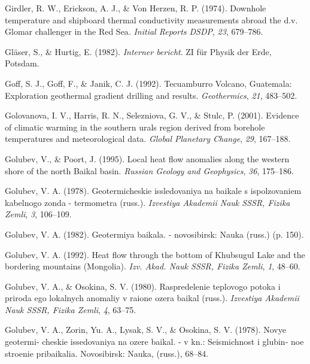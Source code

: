 \documentclass[draft,linenumbers]{agujournal2018}
\begin{document}
\leavevmode{}%
Girdler, R. W., Erickson, A. J., \& Von Herzen, R. P. (1974). Downhole
temperature and shipboard thermal conductivity measurements abroad the
d.v. Glomar challenger in the {Red Sea}. \emph{Initial Reports DSDP},
\emph{23}, 679--786.

\leavevmode{}%
Gläser, S., \& Hurtig, E. (1982). \emph{Interner bericht}. ZI f{ü}r
Physik der Erde, Potsdam.

\leavevmode{}%
Goff, S. J., Goff, F., \& Janik, C. J. (1992). {Tecuamburro Volcano,
Guatemala}: Exploration geothermal gradient drilling and results.
\emph{Geothermics}, \emph{21}, 483--502.

\leavevmode{}%
Golovanova, I. V., Harris, R. N., Selezniova, G. V., \& Stulc, P.
(2001). Evidence of climatic warming in the southern urals region
derived from borehole temperatures and meteorological data. \emph{Global
Planetary Change}, \emph{29}, 167--188.

\leavevmode{}%
Golubev, V., \& Poort, J. (1995). Local heat flow anomalies along the
western shore of the north {Baikal} basin. \emph{Russian Geology and
Geophysics}, \emph{36}, 175--186.

\leavevmode{}%
Golubev, V. A. (1978). Geotermicheskie issledovaniya na baikale s
ispolzovaniem kabelnogo zonda - termometra (russ.). \emph{Izvestiya
Akademii Nauk SSSR, Fizika Zemli}, \emph{3}, 106--109.

\leavevmode{}%
Golubev, V. A. (1982). Geotermiya baikala. - novosibirsk: Nauka (russ.)
(p. 150).

\leavevmode{}%
Golubev, V. A. (1992). Heat flow through the bottom of {Khubsugul Lake}
and the bordering mountains {(Mongolia)}. \emph{Izv. Akad. Nauk SSSR,
Fizika Zemli}, \emph{1}, 48--60.

\leavevmode{}%
Golubev, V. A., \& Osokina, S. V. (1980). Raspredelenie teplovogo potoka
i priroda ego lokalnych anomaliy v raione ozera baikal (russ.).
\emph{Izvestiya Akademii Nauk SSSR, Fizika Zemli}, \emph{4}, 63--75.

\leavevmode{}%
Golubev, V. A., Zorin, Yu. A., Lysak, S. V., \& Osokina, S. V. (1978).
Novye geotermi- cheskie issedovaniya na ozere baikal. - v kn.:
Seismichnost i glubin- noe stroenie pribaikalia. Novosibirsk: Nauka,
(russ.), 68--84.
\end{document}
